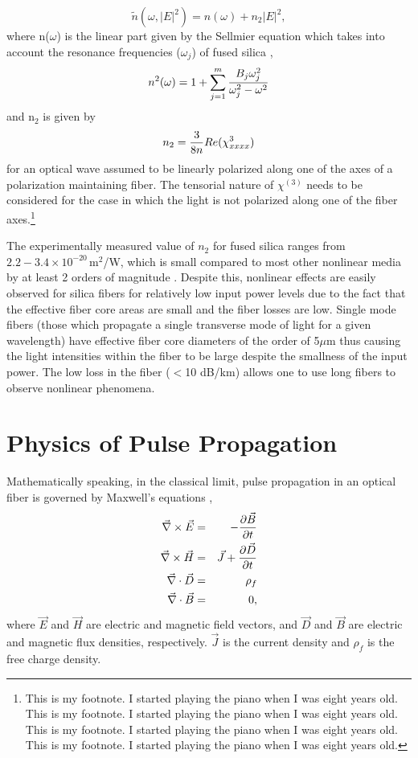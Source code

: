 \begin{equation}
\tilde{n}(\omega,|E|^2) = n(\omega)+n_2|E|^2 ,
\end{equation}
where n($\omega$) is the linear part given by the Sellmier
equation which
takes into account the resonance frequencies ($\omega_j$) of fused
silica \cite{Agrawal1,Marcuse},
\begin{equation}
n^2(\omega) = 1 + \sum_{j=1}^m {B_j\omega^2_j \over \omega^2_j - \omega^2}
\end{equation}
and n$_2$ is given by
\begin{equation}
n_2 = {3 \over 8n}Re(\chi_{xxxx}^3)
\end{equation}
for an optical wave assumed to be linearly polarized along one of the
axes of a polarization maintaining fiber. The tensorial nature of $\chi^{(3)}$ needs to be
considered for the case in which the light is not polarized along one of
the fiber axes.\footnote{This is my footnote.  I started playing the piano when I was eight years old.  This is my footnote.  I started playing the piano when I was eight years old.  This is my footnote.  I started playing the piano when I was eight years old.  This is my footnote.  I started playing the piano when I was eight years old.}

The experimentally measured value of $n_{2}$ for fused silica ranges from $2.2 - 3.4 \times
10^{-20}$\,m$^2$/W, which is small compared to most other nonlinear media by
at least 2 orders of magnitude \cite{Agrawal1}. Despite this, nonlinear effects are
easily observed for silica fibers for relatively low input power levels due
to the fact that the effective fiber core areas are small and the fiber losses are low. Single mode fibers (those which propagate a single transverse mode of light for a given wavelength) have effective fiber core diameters of the order of 5$\mu$m thus causing the light intensities within the fiber to be large despite the smallness of the input power. The low loss in the fiber ($<$10 dB/km) allows one to use long fibers to observe nonlinear phenomena.

\section{Physics of Pulse Propagation}

Mathematically speaking, in the classical limit, pulse propagation in an
optical fiber is governed by Maxwell's equations \cite{Agrawal2,Diament},
\begin{eqnarray}
\vec{\nabla}\times\vec{E} & = &- {\partial \vec{B} \over \partial t} \nonumber\\
\vec{\nabla}\times\vec{H} & = & \vec{J}+ {\partial \vec{D} \over \partial t}
\nonumber\\
\vec{\nabla}\cdot\vec{D} & = & \rho_{f} \nonumber\\
\vec{\nabla}\cdot\vec{B} & = & 0 ,
\end{eqnarray}
where $\vec{E}$ and $\vec{H}$ are electric and magnetic field
vectors, and
$\vec{D}$ and $\vec{B}$ are electric and magnetic flux densities,
respectively. $\vec{J}$ is the current density and $\rho_{f}$ is the free
charge density.

